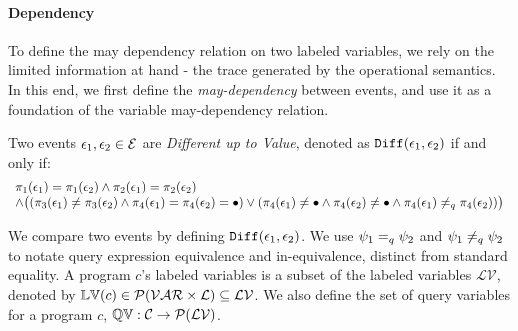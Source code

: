 \paragraph{Dependency}
 To define the may dependency relation on two labeled variables, we rely on the limited information at hand - the trace generated by the operational semantics. In this end, we first define the \emph{may-dependency} between events, and use it as a foundation of the variable may-dependency relation.
\begin{defn}
  Two events $\mathtt{\epsilon}_1, \mathtt{\epsilon}_2 \in \mathcal{E}$ are  \emph{Different up to Value}, 
  denoted as $\mathtt{Diff}(\mathtt{\epsilon}_1, \mathtt{\epsilon}_2)$ if and only if:
  \[
    \begin{array}{l}
  \pi_1(\mathtt{\epsilon}_1) = \pi_1(\mathtt{\epsilon}_2) 
  \land  
  \pi_2(\mathtt{\epsilon}_1) = \pi_2(\mathtt{\epsilon}_2) \\
  \land  
  \big(
    (\pi_3(\mathtt{\epsilon}_1) \neq \pi_3(\mathtt{\epsilon}_2)
  \land 
  \pi_{4}(\mathtt{\epsilon}_1) = \pi_{4}(\mathtt{\epsilon}_2) = \bullet )
  \lor 
  (\pi_4(\mathtt{\epsilon}_1) \neq \bullet
  \land 
  \pi_4(\mathtt{\epsilon}_2) \neq \bullet
  \land 
  \pi_{4}(\mathtt{\epsilon}_1) \neq_q \pi_{4}(\mathtt{\epsilon}_2)) 
  \big)
  \end{array}
  \]
  \end{defn}
 We compare two events by defining $\mathtt{Diff}(\mathtt{\epsilon}_1, \mathtt{\epsilon}_2)$. We use $\psi_1 =_{q} \psi_2$ and $\psi_1 \neq_{q} \psi_2$ to notate query expression equivalence and in-equivalence, distinct from standard equality. A program $c$'s
 labeled variables 
is a subset of
the labeled variables $\mathcal{LV}$, denoted by $\mathbb{LV}(c) \in \mathcal{P}(\mathcal{VAR} \times \mathcal{L}) \subseteq \mathcal{LV}$.
We also define the set of query variables for a program $c$, $\mathbb{QV}: \mathcal{C} \to 
\mathcal{P}(\mathcal{LV})$.

